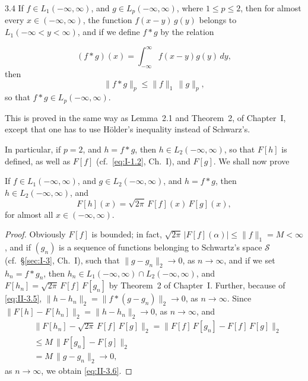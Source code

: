 \begin{nstmt}{3.4}\label{eq:II-3.4}
If $f\in L_{1}(-\infty,\infty)$, and $g\in L_{p}(-\infty,\infty)$, where $1\le p\le 2$, then for almost every $x\in(-\infty,\infty)$, the function $f(x-y)\,g(y)$ belongs to $L_{1}(-\infty<y<\infty)$, and if we define $f*g$ by the relation
\end{nstmt}
\[
(f*g)(x)=\int_{-\infty}^{\infty}f(x-y)g(y)\,dy,
\]
then
\begin{equation}\tag{3.5}\label{eq:II-3.5}
\|f*g\|_{p}\le \|f\|_{1}\,\|g\|_{p},
\end{equation}
so that $f*g\in L_{p}(-\infty,\infty)$.

This is proved in the same way as Lemma~2.1 and Theorem~2, of Chapter~I, except that one has to use H\"older's inequality instead of Schwarz's.

In particular, if $p=2$, and $h=f*g$, then $h\in L_{2}(-\infty,\infty)$, so that $F[h]$ is defined, as well as $F[f]$ (cf.\ \eqref{eq:I-1.2}, Ch.~I), and $F[g]$. We shall now prove

\begin{theorem}\label{thm:II-4}
If $f\in L_{1}(-\infty,\infty)$, and $g\in L_{2}(-\infty,\infty)$, and $h=f*g$, then $h\in L_{2}(-\infty,\infty)$, and
\begin{equation*}\tag{3.6}\label{eq:II-3.6}
F[h](x)=\sqrt{2\pi}\,F[f](x)\,F[g](x),
\end{equation*}
for almost all $x\in(-\infty,\infty)$.
\end{theorem}
\begin{proof}
Obviously $F[f]$ is bounded; in fact, $\sqrt{2\pi}\,|F[f](\alpha)|\le \|f\|_{1}=M<\infty$, and if $(g_{n})$ is a sequence of functions belonging to Schwartz's space $\mathcal S$ (cf.\ \S\ref{sec:I-3}, Ch.~I), such that $\|g-g_{n}\|_{2}\to 0$, as $n\to\infty$, and if we set $h_{n}=f*g_{n}$, then $h_{n}\in L_{1}(-\infty,\infty)\cap L_{2}(-\infty,\infty)$, and $F[h_{n}]=\sqrt{2\pi}\,F[f]\,F[g_{n}]$ by Theorem~2 of Chapter~I. Further, because of \eqref{eq:II-3.5}, $\|h-h_{n}\|_{2}=\|f*(g-g_{n})\|_{2}\to 0$, as $n\to\infty$. Since $\|F[h]-F[h_{n}]\|_{2}=\|h-h_{n}\|_{2}\to 0$, as $n\to\infty$, and
\[
\begin{aligned}
& \|F[h_{n}] - \sqrt{2\pi}\,F[f]\,F[g]\|_{2} = \|F[f]\,F[g_{n}] - F[f]\,F[g]\|_{2}\\
&\le M\,\|F[g_{n}] - F[g]\|_{2}\\
&= M\,\|g-g_{n}\|_{2}\to 0,
\end{aligned}
\]
as $n\to\infty$, we obtain \eqref{eq:II-3.6}.
\end{proof}

